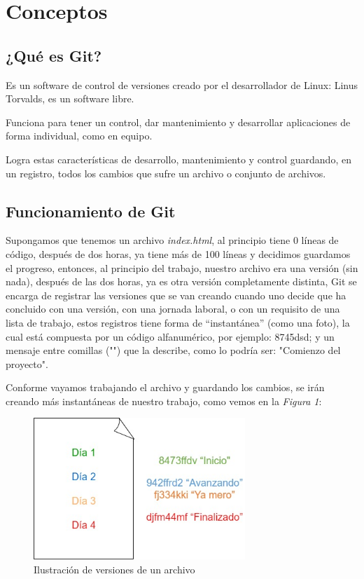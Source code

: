 \section{Conceptos}



\subsection{¿Qué es Git?}
\hspace{0.55cm}Es un software de control de versiones creado por el desarrollador de Linux: Linus Torvalds, es un software libre.

Funciona para tener un control, dar mantenimiento y desarrollar aplicaciones de forma individual, como en equipo.

Logra estas características de  desarrollo, mantenimiento y control guardando, en un registro, todos los cambios que sufre un archivo o conjunto de archivos.

\subsection{Funcionamiento de Git}
\hspace{0.55cm}Supongamos que tenemos un archivo \textit{index.html}, al principio tiene 0 líneas de código, después de dos horas, ya tiene más de 100 líneas y decidimos guardamos el progreso, entonces, al principio del trabajo, nuestro archivo era una versión (sin nada), después de las dos horas, ya es otra versión completamente distinta, Git se encarga de registrar las versiones que se van creando cuando uno decide que ha concluido con una versión, con una jornada laboral, o con un requisito de una lista de trabajo, estos registros tiene forma de “instantánea” (como una foto), la cual está compuesta por un código alfanumérico, por ejemplo: 8745dsd; y un mensaje entre comillas ("") que la describe, como lo podría ser: "Comienzo del proyecto".

Conforme vayamos trabajando el archivo y guardando los cambios, se irán creando más instantáneas de nuestro trabajo, como vemos en la \textit{Figura 1}:
\begin{figure}[H]
    \begin{center}
        \caption{Ilustración de versiones de un archivo}
        \label{fig: 1}
        \includegraphics[width=8cm]{conceptos/g1.jpg}
    \end{center}
\end{figure}


